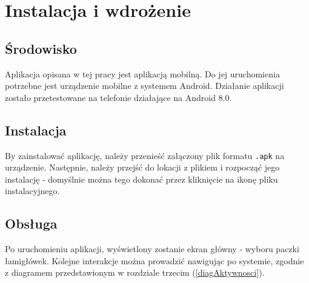 \chapter{Instalacja i wdrożenie}
\thispagestyle{chapterBeginStyle}



\section{Środowisko}
    Aplikacja opisana w tej pracy jest aplikacją mobilną. Do jej uruchomienia potrzebne jest
urządzenie mobilne z systemem Android. Działanie aplikacji zostało przetestowane na telefonie
działające na Android 8.0.


\section{Instalacja}
    By zainstalować aplikację, należy przenieść załączony plik formatu \texttt{.apk} na urządzenie.
Następnie, należy przejść do lokacji z plikiem i rozpocząć jego instalację - domyślnie można
tego dokonać przez kliknięcie na ikonę pliku instalacyjnego.


\section{Obsługa}
    Po uruchomieniu aplikacji, wyświetlony zostanie ekran główny - wyboru paczki łamigłówek.
Kolejne interakcje można prowadzić nawigując po systemie, zgodnie z diagramem przedstawionym w
rozdziale trzecim (\ref{diagAktywnosci}).
